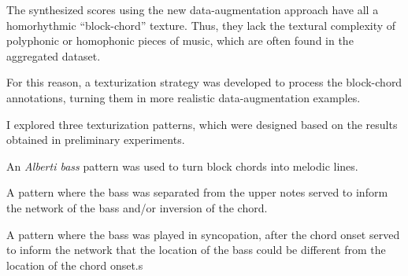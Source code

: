 
The synthesized scores using the new data-augmentation
approach have all a homorhythmic ``block-chord'' texture.
Thus, they lack the textural complexity of polyphonic or
homophonic pieces of music, which are often found in the
aggregated dataset.

For this reason, a texturization strategy was developed to
process the block-chord annotations, turning them in more
realistic data-augmentation examples.

I explored three texturization patterns, which were designed
based on the results obtained in preliminary experiments. 


An \emph{Alberti bass} pattern was used to turn block chords
into melodic lines.


A pattern where the bass was separated from the upper notes
served to inform the network of the bass and/or inversion of
the chord.


A pattern where the bass was played in syncopation, after
the chord onset served to inform the network that the
location of the bass could be different from the location of
the chord onset.s
